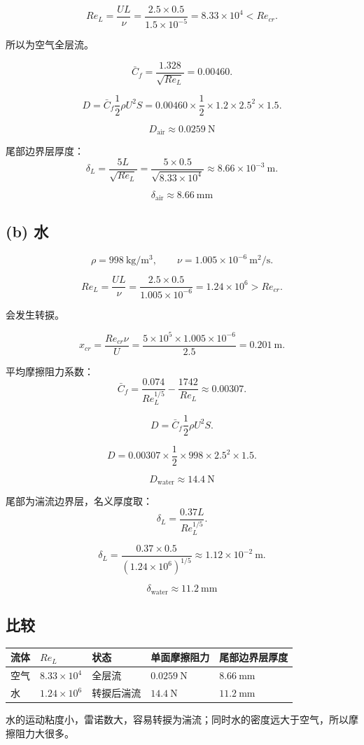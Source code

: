 \documentclass[11pt,a4paper]{ctexart}
\begin{document}
\[
Re_L=\frac{UL}{\nu}
=\frac{2.5\times0.5}{1.5\times10^{-5}}
=8.33\times10^4<Re_{cr}.
\]

所以为空气全层流。

\[
\bar C_f=\frac{1.328}{\sqrt{Re_L}}
=0.00460.
\]

\[
D=\bar C_f\frac12\rho U^2S
=0.00460\times\frac12\times1.2\times2.5^2\times1.5.
\]

\[
\boxed{D_{\mathrm{air}}\approx0.0259\ \mathrm{N}}
\]

尾部边界层厚度：
\[
\delta_L=\frac{5L}{\sqrt{Re_L}}
=\frac{5\times0.5}{\sqrt{8.33\times10^4}}
\approx8.66\times10^{-3}\ \mathrm{m}.
\]

\[
\boxed{\delta_{\mathrm{air}}\approx8.66\ \mathrm{mm}}
\]

\subsection*{(b) 水}

\[
\rho=998\ \mathrm{kg/m^3},\qquad
\nu=1.005\times10^{-6}\ \mathrm{m^2/s}.
\]

\[
Re_L=\frac{UL}{\nu}
=\frac{2.5\times0.5}{1.005\times10^{-6}}
=1.24\times10^6>Re_{cr}.
\]

会发生转捩。

\[
x_{cr}=\frac{Re_{cr}\nu}{U}
=\frac{5\times10^5\times1.005\times10^{-6}}{2.5}
=0.201\ \mathrm{m}.
\]

平均摩擦阻力系数：
\[
\bar C_f=\frac{0.074}{Re_L^{1/5}}-\frac{1742}{Re_L}
\approx0.00307.
\]

\[
D=\bar C_f\frac12\rho U^2S.
\]

\[
D=0.00307\times\frac12\times998\times2.5^2\times1.5.
\]

\[
\boxed{D_{\mathrm{water}}\approx14.4\ \mathrm{N}}
\]

尾部为湍流边界层，名义厚度取：
\[
\delta_L=\frac{0.37L}{Re_L^{1/5}}.
\]

\[
\delta_L=\frac{0.37\times0.5}{(1.24\times10^6)^{1/5}}
\approx1.12\times10^{-2}\ \mathrm{m}.
\]

\[
\boxed{\delta_{\mathrm{water}}\approx11.2\ \mathrm{mm}}
\]

\subsection*{比较}

\begin{center}
\begin{tabular}{lllll}
\toprule
流体 & \(Re_L\) & 状态 & 单面摩擦阻力 & 尾部边界层厚度\\
\midrule
空气 & \(8.33\times10^4\) & 全层流 & \(0.0259\ \mathrm{N}\) & \(8.66\ \mathrm{mm}\)\\
水 & \(1.24\times10^6\) & 转捩后湍流 & \(14.4\ \mathrm{N}\) & \(11.2\ \mathrm{mm}\)\\
\bottomrule
\end{tabular}
\end{center}

水的运动粘度小，雷诺数大，容易转捩为湍流；同时水的密度远大于空气，所以摩擦阻力大很多。
\end{document}
